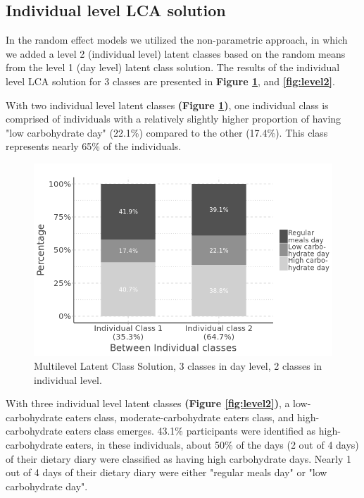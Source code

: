 
\subsection{Individual level LCA solution}

In the random effect models we utilized the non-parametric approach, in which we added a level 2 (individual level) latent classes based on the random means from the level 1 (day level) latent class solution. The results of the individual level LCA solution for 3 classes are presented in \textbf{Figure \ref{fig:CB2level2}}, and \textbf{\ref{fig:level2}}. 

With two individual level latent classes \textbf{(Figure \ref{fig:CB2level2})}, one individual class is comprised of individuals with a relatively slightly higher proportion of having "low carbohydrate day" (22.1\%) compared to the other (17.4\%). This class represents nearly 65\% of the individuals. 


\begin{figure}[H]
	\centering
	\includegraphics[width=13cm]{Figures/CB2level2.png}
	\decoRule
	\caption[Multilevel Latent Class Solution ($3\times2$).]{Multilevel Latent Class Solution, 3 classes in day level, 2 classes in individual level.}
	\label{fig:CB2level2}
\end{figure}


With three individual level latent classes \textbf{(Figure \ref{fig:level2})}, a low-carbohydrate eaters class, moderate-carbohydrate eaters class, and high-carbohydrate eaters class emerges. 43.1\% participants were identified as high-carbohydrate eaters, in these individuals, about 50\% of the days (2 out of 4 days) of their dietary diary were classified as having high carbohydrate days. Nearly 1 out of 4 days of their dietary diary were either "regular meals day" or "low carbohydrate day". 

